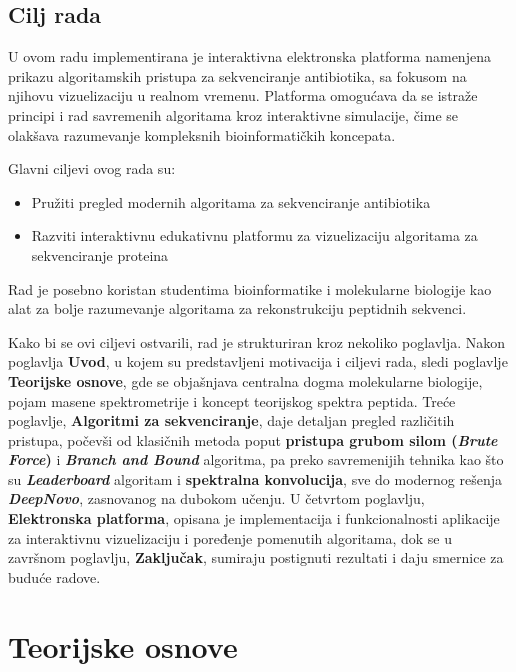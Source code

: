\documentclass[12pt,oneside]{memoir}
\begin{document}
\section{Cilj rada}
U ovom radu implementirana je interaktivna elektronska platforma namenjena prikazu algoritamskih pristupa za sekvenciranje antibiotika, sa fokusom na njihovu vizuelizaciju u realnom vremenu. Platforma omogućava da se istraže principi i rad savremenih algoritama kroz interaktivne simulacije, čime se olakšava razumevanje kompleksnih bioinformatičkih koncepata.

Glavni ciljevi ovog rada su:
\begin{itemize}
    \item Pružiti pregled modernih algoritama za sekvenciranje antibiotika
    \item Razviti interaktivnu edukativnu platformu za vizuelizaciju algoritama za sekvenciranje proteina
\end{itemize}

Rad je posebno koristan studentima bioinformatike i molekularne biologije kao alat za bolje razumevanje algoritama za rekonstrukciju peptidnih sekvenci.


Kako bi se ovi ciljevi ostvarili, rad je strukturiran kroz nekoliko poglavlja. Nakon poglavlja \textbf{Uvod}, u kojem su predstavljeni motivacija i ciljevi rada, sledi poglavlje \textbf{Teorijske osnove}, gde se objašnjava centralna dogma molekularne biologije, pojam masene spektrometrije i koncept teorijskog spektra peptida. Treće poglavlje, \textbf{Algoritmi za sekvenciranje}, daje detaljan pregled različitih pristupa, počevši od klasičnih metoda poput \textbf{pristupa grubom silom (\emph{Brute Force})} i \textbf{\emph{Branch and Bound}} algoritma, pa preko savremenijih tehnika kao što su \textbf{\emph{Leaderboard}} algoritam i \textbf{spektralna konvolucija}, sve do modernog rešenja \textbf{\emph{DeepNovo}}, zasnovanog na dubokom učenju. U četvrtom poglavlju, \textbf{Elektronska platforma}, opisana je implementacija i funkcionalnosti aplikacije za interaktivnu vizuelizaciju i poređenje pomenutih algoritama, dok se u završnom poglavlju, \textbf{Zaključak}, sumiraju postignuti rezultati i daju smernice za buduće radove.

\chapter{Teorijske osnove}
\end{document}
